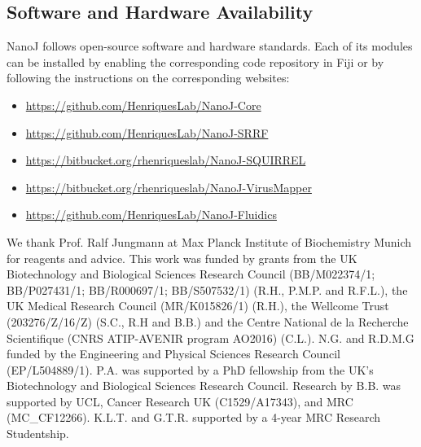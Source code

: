 \subsection*{Software and Hardware Availability}
 NanoJ follows open-source software and hardware standards. Each of its modules can be installed by enabling the corresponding code repository in Fiji or by following the instructions on the corresponding websites:
 \small
 \begin{itemize}
  \item \href{https://github.com/HenriquesLab/NanoJ-Core}{https://github.com/HenriquesLab/NanoJ-Core}
  \item \href{https://github.com/HenriquesLab/NanoJ-SRRF}{https://github.com/HenriquesLab/NanoJ-SRRF}
  \item \href{https://bitbucket.org/rhenriqueslab/nanoj-squirrel}{https://bitbucket.org/rhenriqueslab/NanoJ-SQUIRREL}
  \item \href{https://bitbucket.org/rhenriqueslab/NanoJ-VirusMapper}{https://bitbucket.org/rhenriqueslab/NanoJ-VirusMapper}
  \item \href{https://github.com/HenriquesLab/NanoJ-Fluidics}{https://github.com/HenriquesLab/NanoJ-Fluidics}
\end{itemize}

\begin{acknowledgements}
 We thank Prof. Ralf Jungmann at Max Planck Institute of Biochemistry Munich for reagents and advice. This work was funded by grants from the UK Biotechnology and Biological Sciences Research Council (BB/M022374/1; BB/P027431/1; BB/R000697/1; BB/S507532/1) (R.H., P.M.P. and R.F.L.), the UK Medical Research Council (MR/K015826/1) (R.H.), the Wellcome Trust (203276/Z/16/Z) (S.C., R.H and B.B.) and the Centre National de la Recherche Scientifique (CNRS ATIP-AVENIR program AO2016) (C.L.). N.G. and R.D.M.G funded by the Engineering and Physical Sciences Research Council (EP/L504889/1). P.A. was supported by a PhD fellowship from the UK’s Biotechnology and Biological Sciences Research Council. Research by B.B. was supported by UCL, Cancer Research UK (C1529/A17343), and MRC (MC\_CF12266). K.L.T. and G.T.R. supported by a 4-year MRC Research Studentship.
\end{acknowledgements}

